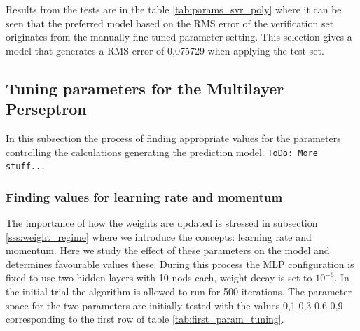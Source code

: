 Results from the tests are in the table \ref{tab:params_svr_poly} where it can be seen that the preferred model based on the RMS error of the verification set originates from the manually fine tuned parameter setting. This selection gives a model that generates a RMS error of 0,075729 when applying the test set.


\subsection{Tuning parameters for the Multilayer Perseptron} \label{sss:tuning_mlp}
In this subsection the process of finding appropriate values for the parameters controlling the calculations generating the prediction model.  
\texttt{ToDo: More stuff...}

\subsubsection{Finding values for learning rate and momentum} \label{sss:tuning_mlp_learning_momentum}
The importance of how the weights are updated is stressed in subsection \ref{sss:weight_regime} where we introduce the concepts: learning rate and momentum. Here we study the effect of these parameters on the model and determines favourable values these. During this process the MLP configuration is fixed to use two hidden layers with 10 nods each, weight decay is set to $10^{-6}$. In the initial trial the algorithm is allowed to run for 500 iterations. The parameter space for the two parameters are initially tested with the values {0,1 0,3 0,6 0,9} corresponding to the first row of table \ref{tab:first_param_tuning}. 

